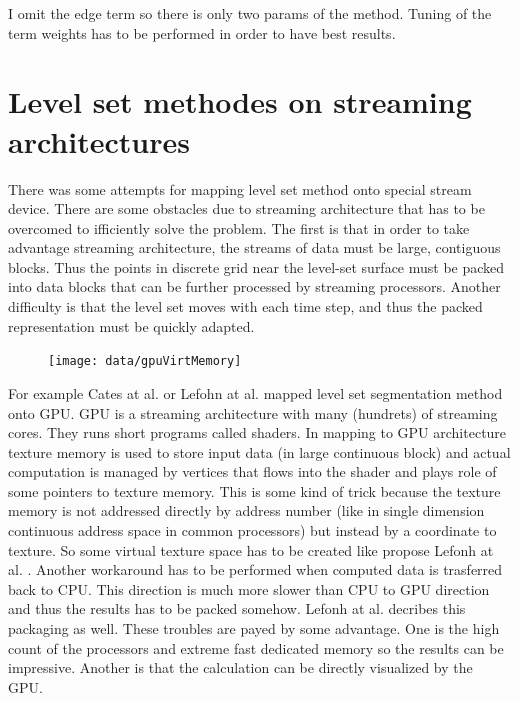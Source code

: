 I omit the edge term so there is only two params of the method. Tuning of the term weights has to be performed in order to have best results.

\section{Level set methodes on streaming architectures}

\par
There was some attempts for mapping level set method onto special stream device.
There are some obstacles due to streaming architecture that has to be overcomed
to ifficiently solve the problem. The first is that in order to take advantage
streaming architecture, the streams of data must be large, contiguous blocks.
Thus the points in discrete grid near the level-set surface must be packed into
data blocks that can be further processed by streaming processors. Another
difficulty is that the level set moves with each time step, and thus the packed
representation must be quickly adapted.

\begin{figure}
    \centering
    \texttt{[image: data/gpuVirtMemory]}
    \caption[Leaking of segmentaion into unwanted places]{}
    \label{fg:virtual memory on GPU}
\end{figure}

\par
For example Cates at al. \cite{GIST} or Lefohn at al. \cite{lefonhGPUSolver} mapped level set segmentation method onto GPU. GPU is a streaming architecture with many (hundrets) of streaming cores. They runs short programs called shaders. In mapping to GPU architecture texture memory is used to store input data (in large continuous block) and actual computation is managed by vertices that flows into the shader and plays role of some pointers to texture memory. This is some kind of trick because the texture memory is not addressed directly by address number (like in single dimension continuous address space in common processors) but instead by a coordinate to texture. So some virtual texture space has to be created like propose Lefonh at al. \cite{lefonhGPUSolver}. Another workaround has to be performed when computed data is trasferred back to CPU. This direction is much more slower than CPU to GPU direction and thus the results has to be packed somehow. Lefonh at al. \cite{lefonhGPUSolver} decribes this packaging as well. These troubles are payed by some advantage. One is the high count of the processors and extreme fast dedicated memory so the results can be impressive. Another is that the calculation can be directly visualized by the GPU.

